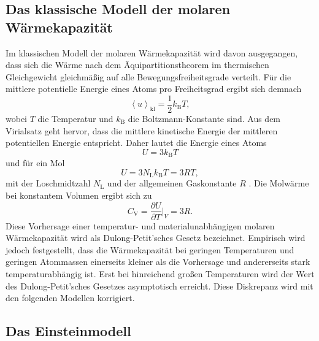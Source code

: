\subsection{Das klassische Modell der molaren Wärmekapazität}

Im klassischen Modell der molaren Wärmekapazität wird davon ausgegangen, dass sich die Wärme nach dem Äquipartitionstheorem im thermischen Gleichgewicht gleichmäßig auf alle Bewegungsfreiheitsgrade verteilt.
Für die mittlere potentielle Energie eines Atoms pro Freiheitsgrad ergibt sich demnach
\begin{equation}
  \left\langle u \right\rangle_{\text{kl}} = \frac{1}{2}k_{\text{B}}T,
\end{equation}
wobei $T$ die Temperatur und $k_{\text{B}}$ die Boltzmann-Konstante \cite{scipy} sind.
Aus dem Virialsatz geht hervor, dass die mittlere kinetische Energie der mittleren potentiellen Energie entspricht.
Daher lautet die Energie eines Atoms
\begin{equation}
  U = 3k_{\text{B}}T
\end{equation}
und für ein Mol
\begin{equation}
  U = 3N_{\text{L}}k_{\text{B}}T = 3RT,
\end{equation}
mit der Loschmidtzahl $N_{\text{L}}$ und der allgemeinen Gaskonstante $R$ \cite{scipy}.
Die Molwärme bei konstantem Volumen ergibt sich zu
\begin{equation}
  C_{\text{V}} = \frac{\partial U}{\partial T}\biggr|_V = 3R.
\end{equation}
Diese Vorhersage einer temperatur- und materialunabhängigen molaren Wärmekapazität wird als Dulong-Petit'sches Gesetz bezeichnet.
Empirisch wird jedoch festgestellt, dass die Wärmekapazität bei geringen Temperaturen und geringen Atommassen einerseits kleiner als die Vorhersage und andererseits stark temperaturabhängig ist.
Erst bei hinreichend großen Temperaturen wird der Wert des Dulong-Petit'sches Gesetzes asymptotisch erreicht.
Diese Diskrepanz wird mit den folgenden Modellen korrigiert.

\subsection{Das Einsteinmodell}

